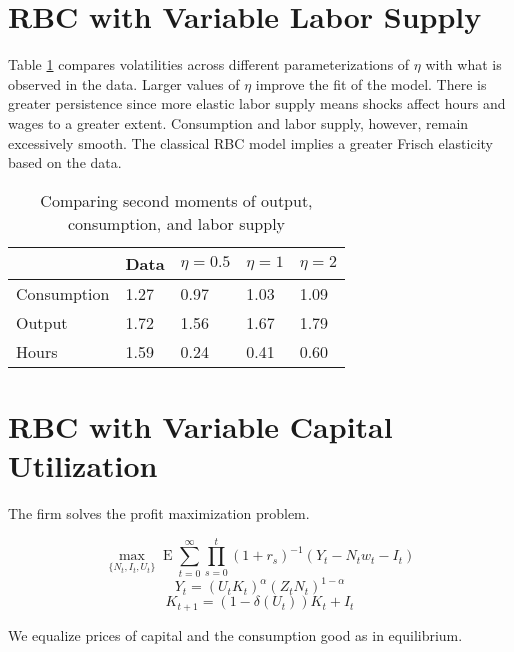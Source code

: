\documentclass[11pt]{article}
\DeclareMathOperator{\ev}{E}
\begin{document}
\section{RBC with Variable Labor Supply}

    Table \ref{tab:varlabor} compares volatilities across different parameterizations of $\eta$ with what is observed in the data. Larger values of $\eta$ improve the fit of the model. There is greater persistence since more elastic labor supply means shocks affect hours and wages to a greater extent. Consumption and labor supply, however, remain excessively smooth. The classical RBC model implies a greater Frisch elasticity based on the data.

    \begin{table}[h]
    \caption{Comparing second moments of output, consumption, and labor supply}
    \label{tab:varlabor}
    \centering
    \begin{tabular}{p{2cm}p{2cm}p{2cm}p{2cm}p{2cm}}
    \hline
     & Data & $\eta = 0.5$ & $\eta = 1$ & $\eta = 2$ \tabularnewline
    \hline
    Consumption & 1.27 & 0.97 & 1.03 & 1.09 \tabularnewline
    Output & 1.72 & 1.56 & 1.67 & 1.79 \tabularnewline
    Hours & 1.59 & 0.24 & 0.41 & 0.60 \tabularnewline
    \hline
    \end{tabular}
    \end{table}

\section{RBC with Variable Capital Utilization}

    The firm solves the profit maximization problem.

        $$ \max_{\{N_t, I_t, U_t\}} \ev \sum_{t=0}^\infty \prod_{s=0}^t (1+r_s)^{-1} (Y_t - N_t w_t - I_t) $$
        $$ Y_t = (U_t K_t)^\alpha (Z_t N_t)^{1-\alpha} $$
        $$ K_{t+1} = (1-\delta(U_t))K_t + I_t $$

    We equalize prices of capital and the consumption good as in equilibrium.
\end{document}
